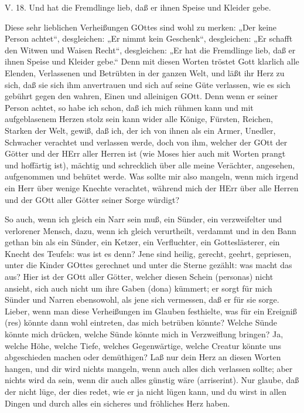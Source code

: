 \begin{schriftzitat}
V. 18. Und hat die Fremdlinge lieb, daß er ihnen Speise und Kleider gebe.
\end{schriftzitat}

Diese sehr lieblichen Verheißungen GOttes sind wohl zu merken: „Der keine Person achtet“, desgleichen: „Er nimmt kein Geschenk“, desgleichen: „Er schafft den Witwen und Waisen Recht“, desgleichen: „Er hat die Fremdlinge lieb, daß er ihnen Speise und Kleider gebe.“ Denn mit diesen Worten tröstet Gott klarlich alle Elenden, Verlassenen und Betrübten in der ganzen Welt, und läßt ihr Herz zu sich, daß sie sich ihm anvertrauen und sich auf seine Güte verlassen, wie es sich gebührt gegen den wahren, Einen und alleinigen GOtt. Denn wenn er seiner Person achtet, so habe ich schon, daß ich mich rühmen kann und mit aufgeblasenem Herzen stolz sein kann wider alle Könige, Fürsten, Reichen, Starken der Welt, gewiß, daß ich, der ich von ihnen als ein Armer, Unedler, Schwacher verachtet und verlassen werde, doch von ihm, welcher der GOtt der Götter und der HErr aller Herren ist (wie Moses hier auch mit Worten prangt und hoffärtig ist), mächtig und schrecklich über alle meine Verächter, angesehen, aufgenommen und behütet werde. Was sollte mir also mangeln, wenn mich irgend ein Herr über wenige Knechte verachtet, während mich der HErr über alle Herren und der GOtt aller Götter seiner Sorge würdigt?

So auch, wenn ich gleich ein Narr sein muß, ein Sünder, ein verzweifelter und verlorener Mensch, dazu, wenn ich gleich verurtheilt, verdammt und in den Bann gethan bin als ein Sünder, ein Ketzer, ein Verfluchter, ein Gotteslästerer, ein Knecht des Teufels: was ist es denn? Jene sind heilig, gerecht, geehrt, gepriesen, unter die Kinder GOttes gerechnet und unter die Sterne gezählt: was macht das aus? Hier ist der GOtt aller Götter, welcher diesen
Schein (personas) nicht ansieht, sich auch nicht um ihre Gaben (dona) kümmert; er sorgt für mich Sünder und Narren ebensowohl, als jene sich vermessen, daß er für sie sorge. Lieber, wenn man diese Verheißungen im Glauben festhielte, was für ein Ereigniß (res) könnte dann wohl eintreten, das mich betrüben könnte? Welche Sünde könnte mich drücken, welche Sünde könnte mich in Verzweiflung bringen? Ja, welche Höhe, welche Tiefe, welches Gegenwärtige, welche Creatur könnte uns abgeschieden machen oder demüthigen? Laß nur dein Herz an diesen Worten hangen, und dir wird nichts mangeln, wenn auch alles dich verlassen sollte; aber nichts wird da sein, wenn dir auch alles günstig wäre (arriserint). Nur glaube, daß der nicht lüge, der dies redet, wie er ja nicht lügen kann, und du wirst in allen Dingen und durch alles ein sicheres und fröhliches Herz haben.


